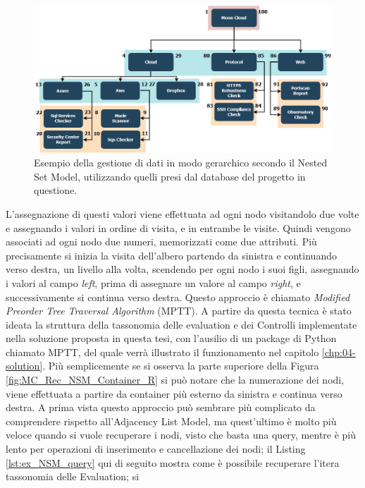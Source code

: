 \begin{figure}[ht!]
    \centering
    \includegraphics[scale=0.40]{images/MC_Rec_NSM_Tree.png}
    \caption{Esempio della gestione di dati in modo gerarchico secondo il Nested Set Model, utilizzando quelli presi dal database del 
    progetto in questione.}
    \label{fig:MC_Rec_NSM_Tree}
\end{figure}
\hfill\break
L'assegnazione di questi valori viene effettuata ad ogni nodo visitandolo due volte e assegnando i valori in ordine di visita, e in entrambe le visite. 
Quindi vengono associati ad ogni nodo due numeri, memorizzati come due attributi. 
Più precisamente si inizia la visita dell'albero partendo da sinistra e continuando verso destra, un livello alla volta, scendendo per ogni 
nodo i suoi figli, assegnando i valori al campo \textit{left}, prima di assegnare un valore al campo \textit{right}, e successivamente si continua verso 
destra. Questo approccio è chiamato \textit{Modified Preorder Tree Traversal Algorithm} (MPTT). A partire da questa tecnica è stato 
ideata la struttura della tassonomia delle evaluation e dei Controlli implementate nella soluzione proposta in questa tesi, con 
l'ausilio di un package di Python chiamato MPTT, del quale verrà illustrato il funzionamento nel capitolo \ref{chp:04-solution}.\hfill\break
Più semplicemente se si osserva la parte superiore della Figura \ref{fig:MC_Rec_NSM_Container_R} si può notare che la numerazione dei nodi, viene 
effettuata a partire da container più esterno da sinistra e continua verso destra.\hfill\break
A prima vista questo approccio può sembrare più complicato da comprendere rispetto all'Adjacency List Model, ma quest'ultimo è 
molto più veloce quando si vuole recuperare i nodi, visto che basta una query, mentre è più lento per operazioni di inserimento e 
cancellazione dei nodi; il Listing \ref{lst:ex_NSM_query} qui di seguito mostra come è possibile recuperare l'itera tassonomia delle Evaluation; si 
